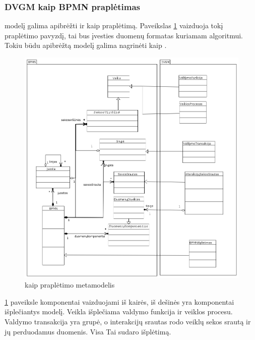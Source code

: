 \subsubsection{DVGM kaip BPMN praplėtimas}

\DVCM{} modelį galima apibrėžti ir kaip \BPMN{} praplėtimą. Paveikslas \ref{img:bpmn_extension_metamodel} vaizduoja tokį praplėtimo pavyzdį, tai bus įvesties duomenų formatas kuriamam algoritmui. Tokiu būdu apibrėžtą modelį galima nagrinėti kaip \BPMN{}.

\begin{figure}[H]
	\centering
	\includegraphics[width=\textwidth]{sections/modeling_methods_and_languages/img/bpmn_extension_metamodel}
	\caption{\DVCM{} kaip \BPMN{} praplėtimo metamodelis}
	\label{img:bpmn_extension_metamodel}
\end{figure}

\ref{img:bpmn_extension_metamodel} paveiksle \BPMN{} komponentai vaizduojami iš kairės, iš dešinės yra komponentai išplečiantys modelį. Veikla išplečiama valdymo funkcija ir veiklos procesu. Valdymo transakcija yra grupė, o interakcijų srautas rodo veiklų sekos srautą ir jų perduodamus duomenis. Visa Tai sudaro \BPMN{} išplėtimą.
